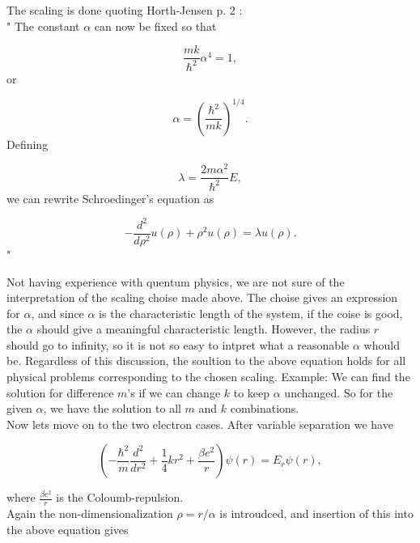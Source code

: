 \documentclass{article}
\begin{document}
The scaling is done quoting Horth-Jensen \cite{MHJProject2} p. 2 :\\

"
The constant $\alpha$ can now be fixed
so that

\begin{equation*}
\frac{mk}{\hbar^2} \alpha^4 = 1,
\end{equation*}
or

\begin{equation*}
\alpha = \left(\frac{\hbar^2}{mk}\right)^{1/4}.
\end{equation*}
Defining

\begin{equation*}
\lambda = \frac{2m\alpha^2}{\hbar^2}E,
\end{equation*}
we can rewrite Schroedinger's equation as

\begin{equation}\label{eq:oneElectronScaled}
-\frac{d^2}{d\rho^2} u(\rho) + \rho^2u(\rho)  = \lambda u(\rho) .
\end{equation}"

Not having experience with quentum physics, we are not sure of the interpretation of the scaling choise made above. The choise gives an expression for $\alpha$, and since $\alpha$ is the characteristic length of the system, if the coise is good, the $\alpha$ should give a meaningful characteristic length. However, the radius $r$ should go to infinity, so it is not so easy to intpret what a reasonable $\alpha$ whould be. Regardless of this discussion, the soultion to the above equation holds for all physical problems corresponding to the chosen scaling. Example: We can find the solution for difference $m$'s if we can change $k$ to keep $\alpha$ unchanged. So for the given $\alpha$, we have the solution to all $m$ and $k$ combinations.\\

Now lets move on to the two electron cases. After variable separation we have

\begin{equation}\label{eq:twoElectronUnscaled}
\left(  -\frac{\hbar^2}{m} \frac{d^2}{dr^2}+ \frac{1}{4}k r^2+\frac{\beta e^2}{r}\right)\psi(r)  = E_r \psi(r),
\end{equation}

where $\frac{\beta e^2}{r}$ is the Coloumb-repulsion.\\

Again the non-dimensionalization $\rho = r/\alpha$ is introudced, and insertion of this into the above equation gives
\end{document}
